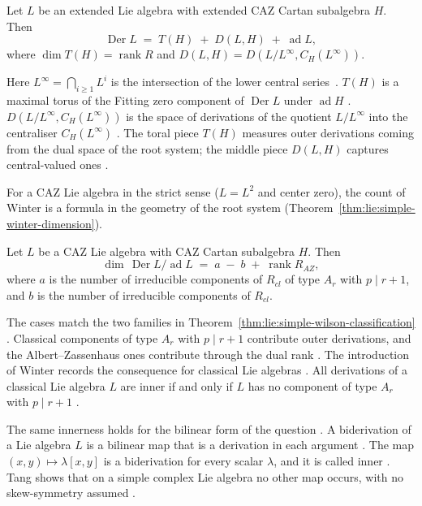\begin{theorem}\label{thm:lie:simple-winter-splitting}
Let $L$ be an extended Lie algebra with extended CAZ Cartan subalgebra
$H$.  Then
\[
\operatorname{Der} L\;=\;T(H)\;+\;D(L,H)\;+\;\operatorname{ad} L,
\]
where $\dim T(H)=\operatorname{rank} R$ and
$D(L,H)=D(L/L^{\infty},C_{H}(L^{\infty}))$.
\end{theorem}

Here $L^{\infty}=\bigcap_{i\geq 1}L^{i}$ is the intersection of the lower
central series~\cite[Theorem~3.4, p.~970]{Winter1984}.
$T(H)$ is a maximal torus of the Fitting zero component of
$\operatorname{Der} L$ under $\operatorname{ad} H$ \cite[p.~961]{Winter1984}.
$D(L/L^{\infty},C_{H}(L^{\infty}))$ is the space of derivations of the
quotient $L/L^{\infty}$ into the centraliser $C_{H}(L^{\infty})$
\cite[p.~961]{Winter1984}.
The toral piece $T(H)$ measures outer
derivations coming from the dual space of the root system; the middle piece
$D(L,H)$ captures central-valued ones
\cite[Theorem~3.4, p.~970]{Winter1984}.

For a CAZ Lie algebra in the strict sense ($L=L^{2}$ and center zero), the
count of Winter is a formula in the geometry of the root system
(Theorem~\ref{thm:lie:simple-winter-dimension}).

\begin{theorem}\label{thm:lie:simple-winter-dimension}
Let $L$ be a CAZ Lie algebra with CAZ Cartan subalgebra $H$.  Then
\[
\dim\,\operatorname{Der} L/\operatorname{ad} L\;=\;a\;-\;b\;+\;\operatorname{rank} R_{AZ},
\]
where $a$ is the number of irreducible components of $R_{cl}$ of type
$A_{r}$ with $p\mid r+1$, and $b$ is the number of irreducible components
of $R_{cl}$.
\end{theorem}

The cases match the two families in
Theorem~\ref{thm:lie:simple-wilson-classification} \cite[p.~961]{Winter1984}.
Classical components of type $A_r$ with $p \mid r+1$ contribute outer
derivations, and the Albert--Zassenhaus ones contribute through the dual rank
\cite[p.~961]{Winter1984}.
The introduction of Winter records the consequence for classical Lie algebras
\cite[p.~1]{Winter1984}.
All derivations of a classical Lie algebra $L$ are inner if and only if $L$
has no component of type $A_{r}$ with $p\mid r+1$ \cite[p.~961]{Winter1984}.

The same innerness holds for the bilinear form of the question
\cite[Definition~1.1, p.~1]{Tang2017Biderivations}. A biderivation of a Lie
algebra $L$ is a bilinear map that is a derivation in each argument
\cite[Definition~1.1, p.~1]{Tang2017Biderivations}. The map $(x,y)\mapsto
\lambda[x,y]$ is a biderivation for every scalar $\lambda$, and it is called
inner \cite[p.~2]{Tang2017Biderivations}. Tang shows that on a simple complex
Lie algebra no other map occurs, with no skew-symmetry assumed
\cite[Theorem~2.4, p.~7]{Tang2017Biderivations}.

